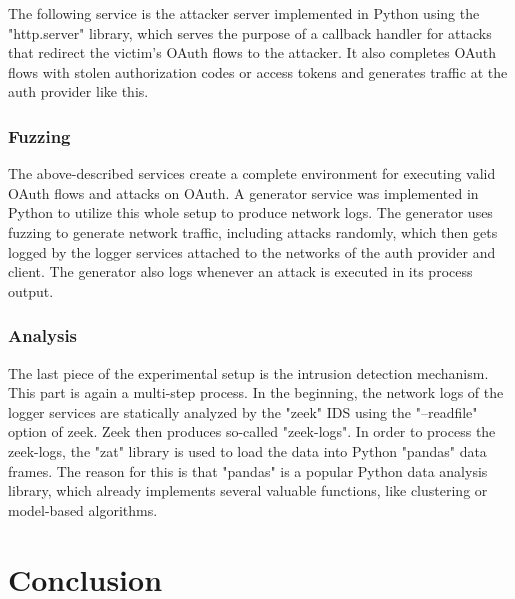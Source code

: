 \documentclass[
    fontsize=12pt,
    headings=small,
    parskip=half,           %
    bibliography=totoc,
    numbers=noenddot,       %
    open=any,               %
    ]{scrreprt}
\begin{document}
The following service is the attacker server implemented in Python using the "http.server" library, which serves the purpose of a callback handler for attacks that redirect the victim's OAuth flows to the attacker. It also completes OAuth flows with stolen authorization codes or access tokens and generates traffic at the auth provider like this.

\subsection{Fuzzing}
The above-described services create a complete environment for executing valid OAuth flows and attacks on OAuth. A generator service was implemented in Python to utilize this whole setup to produce network logs. The generator uses fuzzing to generate network traffic, including attacks randomly, which then gets logged by the logger services attached to the networks of the auth provider and client. The generator also logs whenever an attack is executed in its process output.

\subsection{Analysis}
The last piece of the experimental setup is the intrusion detection mechanism. This part is again a multi-step process. In the beginning, the network logs of the logger services are statically analyzed by the "zeek" IDS using the "--readfile" option of zeek. Zeek then produces so-called "zeek-logs". In order to process the zeek-logs, the "zat" library is used to load the data into Python "pandas" data frames. The reason for this is that "pandas" is a popular Python data analysis library, which already implements several valuable functions, like clustering or model-based algorithms.



\chapter{Conclusion}


\begin{raggedright}         %
  \printbibliography        %
  \label{sec:literaturverzeichnis}
\end{raggedright}
\end{document}
